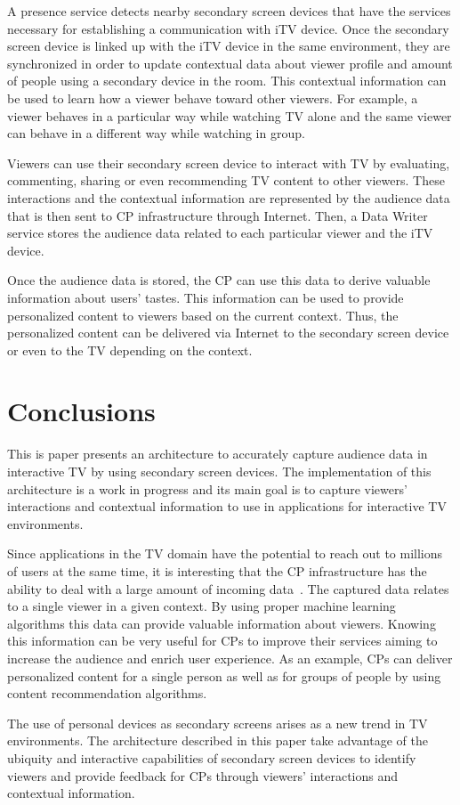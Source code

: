 \documentclass[conference,a4paper]{IEEEtran}
\begin{document}
A presence service detects nearby secondary screen devices that have the services necessary for establishing a communication with iTV device. Once the secondary screen device is linked up with the iTV device in the same environment, they are synchronized in order to update contextual data about viewer profile and amount of people using a secondary device in the room. This contextual information can be used to learn how a viewer behave toward other viewers. For example, a viewer behaves in a particular way while watching TV alone and the same viewer can behave in a different way while watching in group.

Viewers can use their secondary screen device to interact with TV by evaluating, commenting, sharing or even recommending TV content to other viewers. These interactions and the contextual information are represented by the audience data that is then sent to CP infrastructure through Internet. Then, a Data Writer service stores the audience data related to each particular viewer and the iTV device.

Once the audience data is stored, the CP can use this data to derive valuable information about users' tastes. This information can be used to provide personalized content to viewers based on the current context. Thus, the personalized content can be delivered via Internet to the secondary screen device or even to the TV depending on the context.

\section{Conclusions}

This is paper presents an architecture to accurately capture audience data in interactive TV by using secondary screen devices. The implementation of this architecture is a work in progress and its main goal is to capture viewers' interactions and contextual information to use in applications for interactive TV environments.

Since applications in the TV domain have the potential to reach out to millions of users at the same time, it is interesting that the CP infrastructure has the ability to deal with a large amount of incoming data~\cite{Lee2010}. The captured data relates to a single viewer in a given context. By using proper machine learning algorithms this data can provide valuable information about viewers. Knowing this information can be very useful for CPs to improve their services aiming to increase the audience and enrich user experience. As an example, CPs can deliver personalized content for a single person as well as for groups of people by using content recommendation algorithms.

The use of personal devices as secondary screens arises as a new trend in TV environments. The architecture described in this paper take advantage of the ubiquity and interactive capabilities of secondary screen devices to identify viewers and provide feedback for CPs through viewers' interactions and contextual information. 



\end{document}
